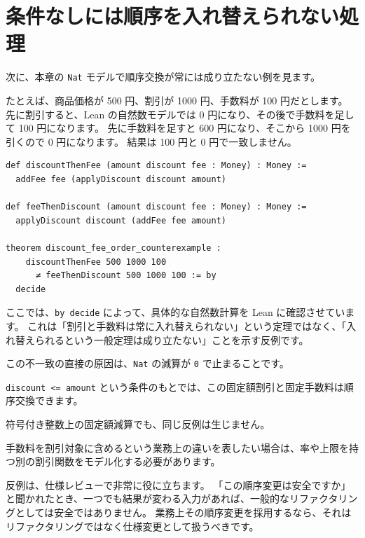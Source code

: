 \FloatBarrier

\section{条件なしには順序を入れ替えられない処理}

次に、本章の \texttt{Nat} モデルで順序交換が常には成り立たない例を見ます。

たとえば、商品価格が 500 円、割引が 1000 円、手数料が 100 円だとします。
先に割引すると、Lean の自然数モデルでは 0 円になり、その後で手数料を足して 100 円になります。
先に手数料を足すと 600 円になり、そこから 1000 円を引くので 0 円になります。
結果は 100 円と 0 円で一致しません。

\begin{listing}[htbp]
\begin{verbatim}
def discountThenFee (amount discount fee : Money) : Money :=
  addFee fee (applyDiscount discount amount)

def feeThenDiscount (amount discount fee : Money) : Money :=
  applyDiscount discount (addFee fee amount)

theorem discount_fee_order_counterexample :
    discountThenFee 500 1000 100
      ≠ feeThenDiscount 500 1000 100 := by
  decide
\end{verbatim}
\caption{\texttt{discount\_fee\_order\_counterexample}}
\label{lst:ch26-discount-fee-counterexample}
\end{listing}

ここでは、\texttt{by decide} によって、具体的な自然数計算を Lean に確認させています。
これは「割引と手数料は常に入れ替えられない」という定理ではなく、「入れ替えられるという一般定理は成り立たない」ことを示す反例です。

この不一致の直接の原因は、\texttt{Nat} の減算が \texttt{0} で止まることです。

\texttt{discount <= amount} という条件のもとでは、この固定額割引と固定手数料は順序交換できます。

符号付き整数上の固定額減算でも、同じ反例は生じません。

手数料を割引対象に含めるという業務上の違いを表したい場合は、率や上限を持つ別の割引関数をモデル化する必要があります。

反例は、仕様レビューで非常に役に立ちます。
「この順序変更は安全ですか」と聞かれたとき、一つでも結果が変わる入力があれば、一般的なリファクタリングとしては安全ではありません。
業務上その順序変更を採用するなら、それはリファクタリングではなく仕様変更として扱うべきです。

